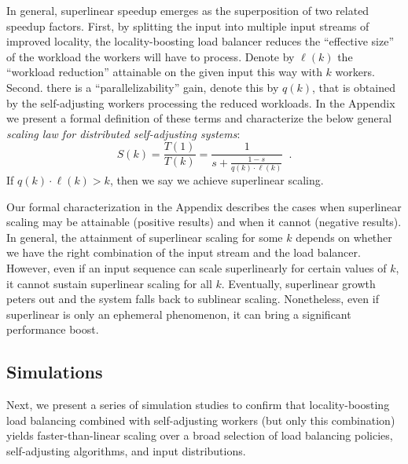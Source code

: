 In general, superlinear speedup emerges as the superposition of two related speedup factors. First, by splitting the input into multiple input streams of improved locality, the locality-boosting load balancer reduces the ``effective size'' of the workload the workers will have to process. Denote by $\ell(k)$ the ``workload reduction'' attainable on the given input this way with $k$ workers. Second. there is a ``parallelizability'' gain, denote this by $q(k)$, that is obtained by the self-adjusting workers processing the reduced workloads.  In the Appendix we present a formal definition of these terms and characterize the below general \emph{scaling law for distributed self-adjusting systems}:
\begin{displaymath}
    S(k) = \frac{T(1)}{T(k)} = \frac{1}{s + \frac{1-s}{q(k) \cdot \ell(k)}} \enspace .
\end{displaymath}
If $q(k) \cdot \ell(k) > k$, then we say we achieve superlinear scaling.

Our formal characterization in the Appendix describes the cases when superlinear scaling may be attainable (positive results) and when it cannot (negative results). In general, the attainment of superlinear scaling for some $k$ depends on whether we have the right combination of the input stream and the load balancer. However, even if an input sequence can scale superlinearly for certain values of $k$, it cannot sustain superlinear scaling for all $k$. Eventually, superlinear growth peters out and the system falls back to sublinear scaling. Nonetheless, even if superlinear is only an ephemeral phenomenon, it can bring a significant performance boost.


\subsection{Simulations}
\label{sec:sims}

Next, we present a series of simulation studies to confirm that locality-boosting load balancing combined with self-adjusting workers (but only this combination) yields faster-than-linear scaling over a broad selection of load balancing policies, self-adjusting algorithms, and input distributions.

